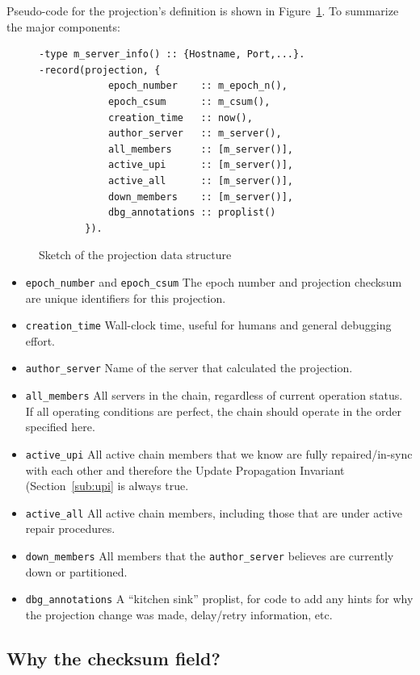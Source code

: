 \documentclass[preprint,10pt]{sigplanconf}
\begin{document}
Pseudo-code for the projection's definition is shown in
Figure~\ref{fig:projection}.  To summarize the major components:

\begin{figure}
\begin{verbatim}
-type m_server_info() :: {Hostname, Port,...}.
-record(projection, {
            epoch_number    :: m_epoch_n(),
            epoch_csum      :: m_csum(),
            creation_time   :: now(),
            author_server   :: m_server(),
            all_members     :: [m_server()],
            active_upi      :: [m_server()],
            active_all      :: [m_server()],
            down_members    :: [m_server()],
            dbg_annotations :: proplist()
        }).
\end{verbatim}
\caption{Sketch of the projection data structure}
\label{fig:projection}
\end{figure}

\begin{itemize}
\item {\tt epoch\_number} and {\tt epoch\_csum} The epoch number and
  projection checksum are unique identifiers for this projection.
\item {\tt creation\_time} Wall-clock time, useful for humans and
  general debugging effort.
\item {\tt author\_server} Name of the server that calculated the projection.
\item {\tt all\_members} All servers in the chain, regardless of current
  operation status.  If all operating conditions are perfect, the
  chain should operate in the order specified here.
\item {\tt active\_upi} All active chain members that we know are
  fully repaired/in-sync with each other and therefore the Update
  Propagation Invariant (Section~\ref{sub:upi} is always true.
\item {\tt active\_all} All active chain members, including those that
  are under active repair procedures.
\item {\tt down\_members} All members that the {\tt author\_server}
  believes are currently down or partitioned.
\item {\tt dbg\_annotations} A ``kitchen sink'' proplist, for code to
  add any hints for why the projection change was made, delay/retry
  information, etc.
\end{itemize}

\subsection{Why the checksum field?}
\end{document}
